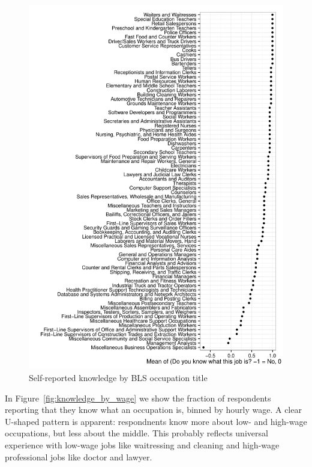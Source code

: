 \documentclass[11pt]{article}
\begin{document}
\begin{figure}
\caption{Self-reported knowledge by BLS occupation title \label{fig:knowledge_by_occupation}} 
\centering
\begin{minipage}{0.95 \linewidth}
\includegraphics[width = \linewidth]{./plots/knowledge_by_occupation.pdf}
\end{minipage}  
\end{figure} 

In Figure~\ref{fig:knowledge_by_wage} we show the fraction of respondents reporting that they know what an occupation is, binned by hourly wage. 
A clear U-shaped pattern is apparent: respondnents know more about low- and high-wage occupations, but less about the middle. 
This probably reflects universal experience with low-wage jobs like waitressing and cleaning and high-wage professional jobs like doctor and lawyer. 
\end{document}
